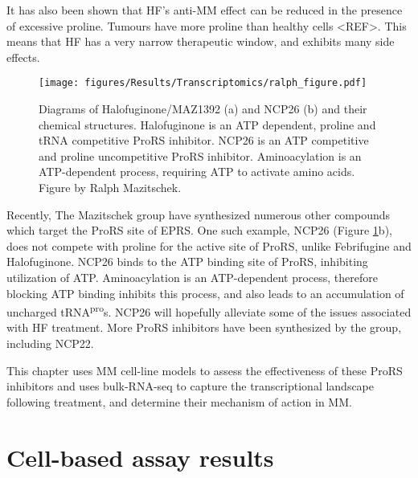 It has also been shown that HF's anti-MM effect can be reduced in the presence of excessive proline.
Tumours have more proline than healthy cells <REF>.
This means that HF has a very narrow therapeutic window, and exhibits many side effects.

\begin{figure}[ht]
    \centering
    \texttt{[image: figures/Results/Transcriptomics/ralph\_figure.pdf]}
    \caption[Halofuginone and NCP26 structures]{Diagrams of Halofuginone/MAZ1392 (a) and NCP26 (b) and their chemical structures.
    Halofuginone is an ATP dependent, proline and tRNA competitive ProRS inhibitor.
    NCP26 is an ATP competitive and proline uncompetitive ProRS inhibitor.
    Aminoacylation is an ATP-dependent process, requiring ATP to activate amino acids.
    Figure by Ralph Mazitschek.
    }
    \label{fig:ralph_diagrams}
\end{figure}

Recently, The Mazitschek group have synthesized numerous other compounds which target the ProRS site of EPRS.
One such example, NCP26 (Figure \ref{fig:ralph_diagrams}b), does not compete with proline for the active site of ProRS, unlike Febrifugine and Halofuginone.
NCP26 binds to the ATP binding site of ProRS, inhibiting utilization of ATP\@.
Aminoacylation is an ATP-dependent process, therefore blocking ATP binding inhibits this process, and also leads to an accumulation of uncharged tRNA\textsuperscript{pro}s.
NCP26 will hopefully alleviate some of the issues associated with HF treatment.
More ProRS inhibitors have been synthesized by the group, including NCP22.

This chapter uses MM cell-line models to assess the effectiveness of these ProRS inhibitors and uses bulk-RNA-seq to capture the transcriptional landscape following treatment, and determine their mechanism of action in MM\@.

\clearpage

\section{Cell-based assay results}
